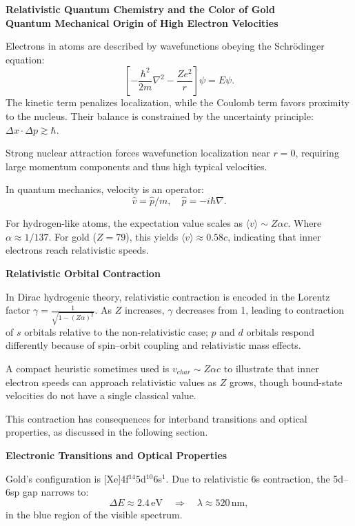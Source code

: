 \begin{technical}
    \sloppy
    {\Large\textbf{Relativistic Quantum Chemistry and the Color of Gold}}\\[0.3em]
    
    \noindent\textbf{Quantum Mechanical Origin of High Electron Velocities}
    
    Electrons in atoms are described by wavefunctions obeying the Schrödinger equation:
    \[
    \left[ -\frac{\hbar^2}{2m} \nabla^2 - \frac{Ze^2}{r} \right] \psi = E \psi.
    \]
    The kinetic term penalizes localization, while the Coulomb term favors proximity to the nucleus. Their balance is constrained by the uncertainty principle: $\Delta x \cdot \Delta p \gtrsim \hbar$.
    
    Strong nuclear attraction forces wavefunction localization near $r = 0$, requiring large momentum components and thus high typical velocities.
    
    In quantum mechanics, velocity is an operator:
    \[
    \hat{v} = \hat{p}/m, \quad \hat{p} = -i\hbar \nabla.
    \]

    For hydrogen-like atoms, the expectation value scales as $\langle v \rangle \sim Z\alpha c$. Where $ \alpha \approx 1/137 $. For gold (\(Z = 79\)), this yields \(\langle v \rangle \approx 0.58c\), indicating that inner electrons reach relativistic speeds.
    
    \noindent\textbf{Relativistic Orbital Contraction}

In Dirac hydrogenic theory, relativistic contraction is encoded in the Lorentz factor \(\gamma = \frac{1}{\sqrt{1 - (Z\alpha)^2}}\). As \(Z\) increases, \(\gamma\) decreases from 1, leading to contraction of \(s\) orbitals relative to the non-relativistic case; \(p\) and \(d\) orbitals respond differently because of spin–orbit coupling and relativistic mass effects.

A compact heuristic sometimes used is \(v_{char} \sim Z\alpha c\) to illustrate that inner electron speeds can approach relativistic values as \(Z\) grows, though bound-state velocities do not have a single classical value.

This contraction has consequences for interband transitions and optical properties, as discussed in the following section.
    
    \noindent\textbf{Electronic Transitions and Optical Properties}
    
    Gold's configuration is [Xe]4f$^{14}$5d$^{10}$6s$^1$. Due to relativistic 6s contraction, the 5d–6sp gap narrows to:
    \[
    \Delta E \approx 2.4\,\text{eV} \quad \Rightarrow \quad \lambda \approx 520\,\text{nm},
    \]
    in the blue region of the visible spectrum.
    

\end{technical}
